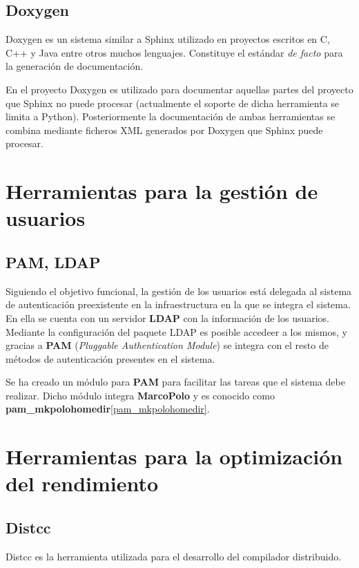 \subsection{Doxygen}

Doxygen es un sistema similar a Sphinx utilizado en proyectos escritos en C, C++ y Java entre otros muchos lenguajes. Constituye el estándar \textit{de facto} para la generación de documentación.

En el proyecto Doxygen es utilizado para documentar aquellas partes del proyecto que Sphinx no puede procesar (actualmente el soporte de dicha herramienta se limita a Python). Posteriormente la documentación de ambas herramientas se combina mediante ficheros XML generados por Doxygen que Sphinx puede procesar.

\section{Herramientas para la gestión de usuarios}

\subsection{PAM, LDAP}

Siguiendo el objetivo funcional\citationneeded, la gestión de los usuarios está delegada al sistema de autenticación preexistente en la infraestructura en la que se integra el sistema. En ella se cuenta con un servidor \textbf{LDAP} con la información de los usuarios. Mediante la configuración del paquete LDAP es posible accedeer a los mismos, y gracias a \textbf{PAM} (\textit{Pluggable Authentication Module}) se integra con el resto de métodos de autenticación presentes en el sistema.

Se ha creado un módulo para \textbf{PAM} para facilitar las tareas que el sistema debe realizar. Dicho módulo integra \textbf{MarcoPolo} y es conocido como \textbf{pam\_mkpolohomedir}\ref{pam_mkpolohomedir}. 

\section{Herramientas para la optimización del rendimiento}

\subsection{Distcc}

Distcc es la herramienta utilizada para el desarrollo del compilador distribuido. %

